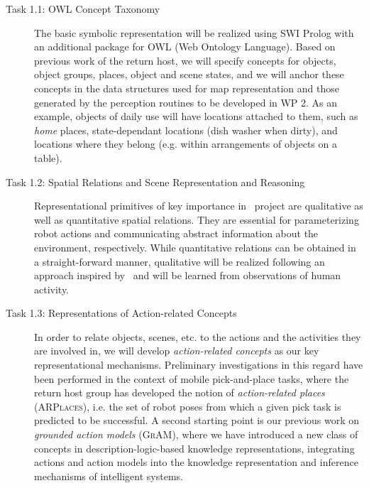 \begin{description}
  \item[Task 1.1: OWL Concept Taxonomy] The basic symbolic
    representation will be realized using SWI Prolog with an additional
    package for OWL (Web Ontology Language). Based on previous work of
    the return host, we will specify concepts for objects, object groups,
    places, object and scene states, and we will anchor these concepts
    in the data structures used for map representation and those
    generated by the perception routines to be developed in WP 2.
    As an example, objects of daily use will have locations attached to
    them, such as \emph{home} places, state-dependant locations (dish
    washer when dirty), and locations where they belong (e.g. within
    arrangements of objects on a table).
  \item[Task 1.2: Spatial Relations and Scene Representation and
    Reasoning] Representational primitives of key importance in
    \ksem\ project are qualitative as well as quantitative spatial relations.
    They are essential for parameterizing robot actions and
    communicating abstract information about the environment,
    respectively. While quantitative relations can be obtained in a
    straight-forward manner, qualitative will be realized following an
    approach inspired by~\cite{Gapp95} and will be learned from
    observations of human activity.
    
  \item[Task 1.3: Representations of Action-related Concepts]
    In order to relate objects, scenes, etc. to the actions and the
    activities they are involved in, we will develop \emph{action-related
    concepts} as our key representational mechanisms. Preliminary
    investigations in this regard have been performed in the context
    of mobile pick-and-place tasks, where the return host group has
    developed the notion of \emph{action-related places} (\textsc{ARPlaces}), i.e. the
    set of robot poses from which a given pick task is predicted to be
    successful. A second starting point is our previous work on
    \emph{grounded action models} (\textsc{GrAM}), where we have introduced a
    new class of concepts in description-logic-based knowledge
    representations, integrating actions and action models into the
    knowledge representation and inference mechanisms of intelligent
    systems. 
     


\end{description}
